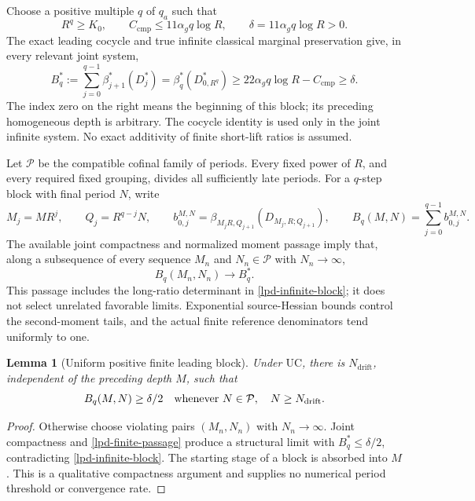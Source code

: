 \documentclass[11pt]{article}
\newtheorem{lemma}[theorem]{Lemma}
\theoremstyle{remark}
\begin{document}
Choose a positive multiple \(q\) of \(q_a\) such that
\begin{equation}
 R^q\ge K_0,\qquad
 C_{\mathrm{cmp}}\le 11\alpha_g q\log R,
 \qquad
 \delta=11\alpha_g q\log R>0.
 \label{lpd-q-choice}
\end{equation}
The exact leading cocycle and true infinite classical marginal
preservation give, in every relevant joint system,
\begin{equation}
 B_q^{*}:=\sum_{j=0}^{q-1}\beta_{j+1}^{*}(D_j^{*})
       =\beta_q^{*}(D_{0,R^q}^{*})
       \ge 22\alpha_g q\log R-C_{\mathrm{cmp}}
       \ge\delta.
 \label{lpd-infinite-block}
\end{equation}
The index zero on the right means the beginning of this block;
its preceding homogeneous depth is arbitrary. The cocycle identity
is used only in the joint infinite system. No exact additivity
of finite short-lift ratios is assumed.

Let \(\mathcal P\) be the compatible cofinal family of periods.
Every fixed power of \(R\), and every required fixed grouping,
divides all sufficiently late periods. For a \(q\)-step block
with final period \(N\), write
\begin{equation}
 M_j=MR^j,\qquad Q_j=R^{q-j}N,\qquad
 b_{0,j}^{M,N}
  =\beta_{M_jR,Q_{j+1}}(D_{M_j,R;Q_{j+1}}),\qquad
 B_q(M,N)=\sum_{j=0}^{q-1}b_{0,j}^{M,N}.
 \label{lpd-finite-block}
\end{equation}
The available joint compactness and normalized moment passage imply
that, along a subsequence of every sequence \(M_n\) and
\(N_n\in\mathcal P\) with \(N_n\to\infty\),
\begin{equation}
 B_q(M_n,N_n)\longrightarrow B_q^{*}.
 \label{lpd-finite-passage}
\end{equation}
This passage includes the long-ratio determinant in
\eqref{lpd-infinite-block}; it does not select unrelated favorable
limits. Exponential source-Hessian bounds control the second-moment
tails, and the actual finite reference denominators tend uniformly
to one.

\begin{lemma}[Uniform positive finite leading block]
\label{lpd-finite-drift}
Under \(\mathrm{UC}\), there is \(N_{\mathrm{drift}}\), independent
of the preceding depth \(M\), such that
\begin{equation}
 B_q(M,N)\ge\delta/2
 \quad\hbox{whenever }N\in\mathcal P,\quad
                         N\ge N_{\mathrm{drift}}.
 \label{lpd-finite-leading-positive}
\end{equation}
\end{lemma}
\begin{proof}
Otherwise choose violating pairs \((M_n,N_n)\) with
\(N_n\to\infty\). Joint compactness and
\eqref{lpd-finite-passage} produce a structural limit with
\(B_q^{*}\le\delta/2\), contradicting
\eqref{lpd-infinite-block}. The starting stage of a block is absorbed
into \(M\). This is a qualitative compactness argument and supplies
no numerical period threshold or convergence rate.
\end{proof}
\end{document}
